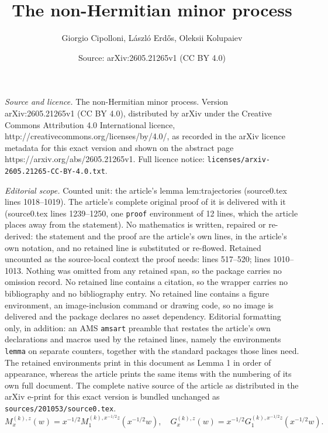 \documentclass[10pt,a4paper]{amsart}
\title{The non-Hermitian minor process}
\author{Giorgio Cipolloni, L\'aszl\'o Erd\H{o}s, Oleksii Kolupaiev}
\date{Source: arXiv:2605.21265v1 (CC BY 4.0)}
\begin{document}
\maketitle

\noindent\emph{Source and licence.} The non-Hermitian minor process. Version arXiv:2605.21265v1 (CC BY 4.0), distributed by arXiv under the Creative Commons Attribution 4.0 International licence, http://creativecommons.org/licenses/by/4.0/, as recorded in the arXiv licence metadata for this exact version and shown on the abstract page https://arxiv.org/abs/2605.21265v1. Full licence notice: \texttt{licenses/arxiv-2605.21265-CC-BY-4.0.txt}.\par\smallskip

\noindent\textit{Editorial scope.} Counted unit: the article's lemma lem:trajectories (source0.tex lines 1018--1019). The article's complete original proof of it is delivered with it (source0.tex lines 1239--1250, one \texttt{proof} environment of 12 lines, which the article places away from the statement). No mathematics is written, repaired or re-derived: the statement and the proof are the article's own lines, in the article's own notation, and no retained line is substituted or re-flowed.  Retained uncounted as the source-local context the proof needs: lines 517--520; lines 1010--1013.  Nothing was omitted from any retained span, so the package carries no omission record.  No retained line contains a citation, so the wrapper carries no bibliography and no bibliography entry.  No retained line contains a figure environment, an image-inclusion command or drawing code, so no image is delivered and the package declares no asset dependency.  Editorial formatting only, in addition: an AMS \texttt{amsart} preamble that restates the article's own declarations and macros used by the retained lines, namely the environments \texttt{lemma} on separate counters, together with the standard packages those lines need.  The retained environments print in this document as Lemma 1 in order of appearance, whereas the article prints the same items with the numbering of its own full document.  The complete native source of the article as distributed in the arXiv e-print for this exact version is bundled unchanged as \texttt{sources/201053/source0.tex}.
\begin{equation}
M_x^{(k),z}(w) =x^{-1/2} M_1^{(k),x^{-1/2}z}\left(x^{-1/2}w\right),\quad G_x^{(k),z}(w) =x^{-1/2} G_1^{(k),x^{-1/2}z}\left(x^{-1/2}w\right).
\label{eq:M_rescaling}
\end{equation}
\end{document}
